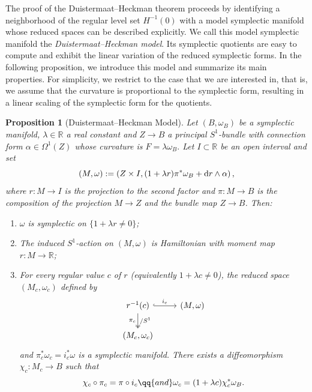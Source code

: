 \documentclass[10pt,oneside,reqno]{amsart}
\newtheorem{proposition}[theorem]{Proposition}
\theoremstyle{definition}
\renewcommand{\dd}{\textup{d}}
\newcommand{\IR}{\mathbb{R}}
\newcommand{\R}{\mathbb{R}}
\begin{document}
The proof of the Duistermaat--Heckman theorem proceeds by identifying a neighborhood of the regular level set $H^{-1}(0)$ with a model symplectic manifold whose reduced spaces can be described explicitly. We call this model symplectic manifold the \emph{Duistermaat--Heckman model}.
Its symplectic quotients are easy to compute and exhibit the linear variation of the reduced symplectic forms. In the following proposition, we introduce this model and summarize its main properties. For simplicity, we restrict to the case that we are interested in, that is, we assume that the curvature is proportional to the symplectic form, resulting in a linear scaling of the symplectic form for the quotients.
\begin{proposition}[Duistermaat--Heckman Model]
\label{prop:DHmodel}
Let $(B,\omega_B)$ be a symplectic manifold, $\lambda\in \IR$ a real constant and $Z\to B$ a principal $S^1$-bundle with connection form $\alpha\in \Omega^1(Z)$ whose curvature is $F=\lambda\omega_B.$
Let $I\subset\R$ be an open interval and set $$(M,\omega):=\left(Z\times I,(1+\lambda r)\pi^*\omega_B+\dd r\wedge\alpha\right),$$ where $r:M\to I$ is the projection to the second factor and $\pi:M\to B$ is the composition of the projection $M\to Z$ and the bundle map $Z\to B$. Then:
\begin{enumerate}
\item $\omega$ is symplectic on $\{1+\lambda r\neq0\}$;
\item The induced $S^1$-action on $(M,\omega)$ is Hamiltonian with moment map
$r:M\to \IR$;
\item For every regular value $c$ of $r$ (equivalently $1+\lambda c\neq 0$), the reduced space $(M_c,\omega_c)$ defined by
\begin{equation*}
    \begin{tikzcd}
        r^{-1}(c) \arrow[r,hook,"i_c"] \arrow[d,two heads,"\pi_c"',"/S^1"] & (M,\omega) \\
        (M_c,\omega_c)
    \end{tikzcd}
\end{equation*}
and $\pi_c^*\omega_c = i_c^*\omega$ is a symplectic manifold. There exists a
diffeomorphism $\chi_c:M_c \longrightarrow B$ such that
\begin{equation*}
    \chi_c \circ \pi_c = \pi \circ i_c \qq{and} \omega_c = (1+\lambda c) \chi_c^*\omega_B
.
\end{equation*}
\end{enumerate}
\end{proposition}
\end{document}
